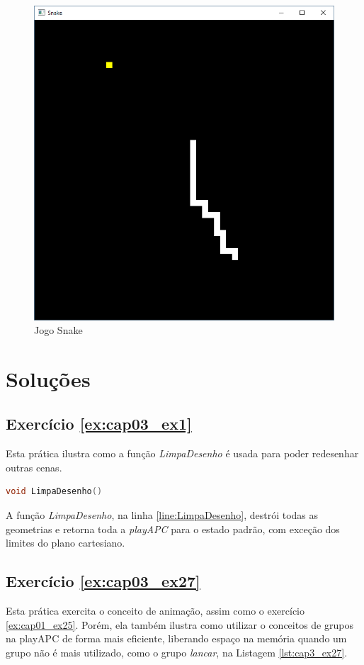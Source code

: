 \begin{enumerate}
  \begin{figure}[H]
    \centerline{\includegraphics[width=.5\textwidth]{img/cap3_ex10.png}}
    \caption{Jogo Snake}
    \label{fig:cap03_ex2}
  \end{figure}

\end{enumerate}

\section*{Soluções}

\subsection*{Exercício \ref{ex:cap03_ex1} }

Esta prática ilustra como a função \emph{LimpaDesenho} é usada para poder redesenhar outras cenas.


\begin{lstlisting}[label={func:LimpaDesenho},language=C++]
void LimpaDesenho() 
\end{lstlisting}
A função \emph{LimpaDesenho}, na linha \ref{line:LimpaDesenho}, destrói todas as geometrias e retorna toda a \emph{playAPC} para o estado padrão, com exceção dos limites do plano cartesiano.

\subsection*{Exercício \ref{ex:cap03_ex27} }

Esta prática exercita o conceito de animação, assim como o exercício \ref{ex:cap01_ex25}. Porém, ela também ilustra como utilizar o conceitos de grupos na playAPC de forma mais eficiente, liberando espaço na memória quando um grupo não é mais utilizado, como o grupo \emph{lancar}, na Listagem \ref{lst:cap3_ex27}.


